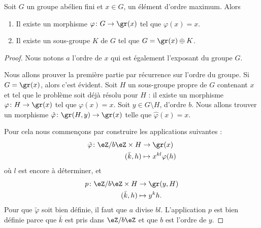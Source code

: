 \begin{proposition} \label{PropfPRVxi}
    Soit \( G\) un groupe abélien fini et \( x\in G\), un élément d'ordre maximum. Alors
    \begin{enumerate}
        \item
            Il existe un morphisme \( \varphi\colon G\to \gr(x)\) tel que \( \varphi(x)=x\).
        \item   \label{ItemKRYwjU}
            Il existe un sous-groupe \( K\) de \( G\) tel que \( G=\gr(x)\oplus K\).
    \end{enumerate}
\end{proposition}

\begin{proof}
    Nous notons \( a\) l'ordre de \( x\) qui est également l'exposant du groupe \( G\).

    Nous allons prouver la première partie par récurrence sur l'ordre du groupe. Si \( G=\gr(x)\), alors c'est évident. Soit \( H\) un sous-groupe propre de \( G\) contenant \( x\) et tel que le problème soit déjà résolu pour \( H\) : il existe un morphisme \( \varphi\colon H\to \gr(x)\) tel que \( \varphi(x)=x\). Soit \( y\in G\setminus H\), d'ordre \( b\). Nous allons trouver un morphisme $\hat\varphi\colon \gr(H,y)\to \gr(x) $ telle que \( \hat\varphi(x)=x\).

    Pour cela nous commençons par construire les applications suivantes :
    \begin{equation}
        \begin{aligned}
            \tilde \varphi\colon \eZ/b\eZ\times H&\to \gr(x) \\
            (\bar k,h)&\mapsto x^{kl}\varphi(h)
        \end{aligned}
    \end{equation}
    où \( l\) est encore à déterminer, et
    \begin{equation}
        \begin{aligned}
            p\colon \eZ/b\eZ\times H&\to \gr(y,H) \\
            (\bar k,h)&\mapsto y^kh.
        \end{aligned}
    \end{equation}
    Pour que \( \tilde \varphi\) soit bien définie, il faut que \( a\) divise \( bl\). L'application \( p\) est bien définie parce que \( \bar k\) est pris dans \( \eZ/b\eZ\) et que \( b\) est l'ordre de \( y\).


\end{proof}
